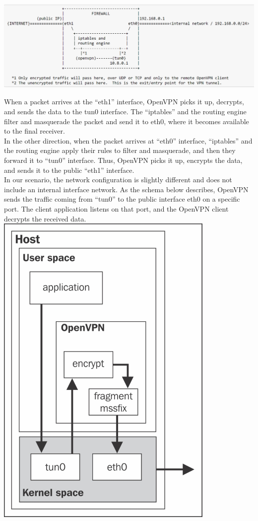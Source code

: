 \documentclass[12pt]{article}
\begin{document}
	\includegraphics[width=1\textwidth]{images/openvpn_routing_setup.PNG}

	When a packet arrives at the ``eth1'' interface, OpenVPN picks it up, decrypts, and sends the data to the tun0 interface. The ``iptables'' and the routing engine filter and masquerade the packet and send it to eth0, where it becomes available to the final receiver.\\
	In the other direction, when the packet arrives at ``eth0'' interface, ``iptables'' and the routing engine apply their rules to filter and masquerade, and then they forward it to ``tun0'' interface. Thus, OpenVPN picks it up, encrypts the data, and sends it to the public ``eth1'' interface.\\
	In our scenario, the network configuration is slightly different and does not include an internal interface network. As the schema below describes, OpenVPN sends the traffic coming from ``tun0'' to the public interface eth0 on a specific port. The client application listens on that port, and the OpenVPN client decrypts the received data.\\

	\includegraphics{images/openvpn_tun_interface.jpg}
\end{document}
